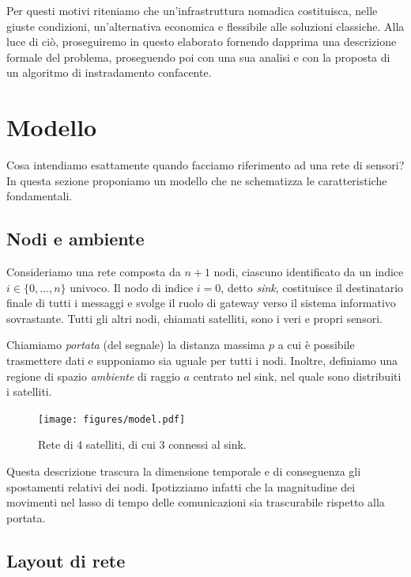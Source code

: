 \documentclass[a4paper,12pt]{article}
\theoremstyle{definition}
\begin{document}
Per questi motivi riteniamo che un'infrastruttura nomadica costituisca, nelle giuste condizioni, un'alternativa economica e flessibile alle soluzioni classiche. Alla luce di ciò, proseguiremo in questo elaborato fornendo dapprima una descrizione formale del problema, proseguendo poi con una sua analisi e con la proposta di un algoritmo di instradamento confacente.

\section{Modello}

Cosa intendiamo esattamente quando facciamo riferimento ad una rete di sensori? In questa sezione proponiamo un modello che ne schematizza le caratteristiche fondamentali.


\subsection{Nodi e ambiente}

Consideriamo una rete composta da $n+1$ nodi, ciascuno identificato da un indice $i \in \{0, \dots, n\}$ univoco. Il nodo di indice $i=0$, detto \emph{sink}, costituisce il destinatario finale di tutti i messaggi e svolge il ruolo di gateway verso il sistema informativo sovrastante. Tutti gli altri nodi, chiamati satelliti, sono i veri e propri sensori.

Chiamiamo \emph{portata} (del segnale) la distanza massima $p$ a cui è possibile trasmettere dati e supponiamo sia uguale per tutti i nodi. Inoltre, definiamo una regione di spazio \emph{ambiente} di raggio $a$ centrato nel sink, nel quale sono distribuiti i satelliti.

\begin{figure}[H]
\centering
\texttt{[image: figures/model.pdf]}
\caption{Rete di 4 satelliti, di cui 3 connessi al sink.}
\end{figure}

Questa descrizione trascura la dimensione temporale e di conseguenza gli spostamenti relativi dei nodi. Ipotizziamo infatti che la magnitudine dei movimenti nel lasso di tempo delle comunicazioni sia trascurabile rispetto alla portata.

\subsection{Layout di rete}
\end{document}
